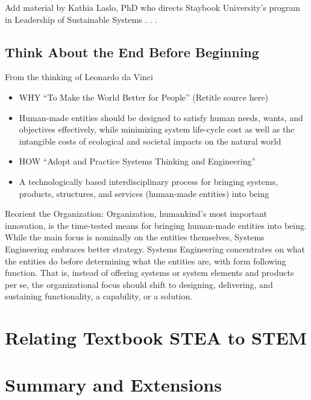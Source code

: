 	Add material by Kathia Laslo, PhD who directs Staybook University’s program in Leadership of Sustainable Systems . . . 
    
\subsection{Think About the End Before Beginning}

From the thinking of Leonardo da Vinci
\begin{itemize}
\item WHY “To Make the World Better for People” (Retitle source here)
\item Human-made entities should be designed to satisfy human needs, wants, and objectives effectively, while minimizing system life-cycle cost as well as the intangible costs of ecological and societal impacts on the natural world
\item HOW ``Adopt and Practice Systems Thinking and Engineering''
\item A technologically based interdisciplinary process for bringing systems, products, structures, and services (human-made entities) into being
\end{itemize}

Reorient the Organization: Organization, humankind’s most important innovation, is the time-tested means for bringing human-made entities into being. While the main focus is nominally on the entities themselves, Systems Engineering embraces better strategy. Systems Engineering concentrates on what the entities do before determining what the entities are, with form following function. That is, instead of offering systems or system elements and products per se, the organizational focus should shift to designing, delivering, and sustaining functionality, a capability, or a solution.


\section{Relating Textbook STEA to STEM}


\section{Summary and Extensions}

